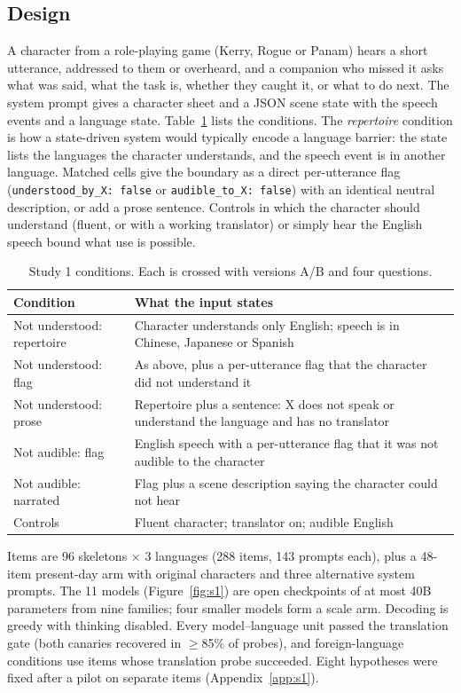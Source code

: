 \documentclass[11pt]{article}
\begin{document}
\subsection{Design}
A character from a role-playing game (Kerry, Rogue or Panam) hears a short utterance, addressed to them or overheard, and a companion who missed it asks what was said, what the task is, whether they caught it, or what to do next. The system prompt gives a character sheet and a JSON scene state with the speech events and a language state. Table~\ref{tab:s1design} lists the conditions. The \emph{repertoire} condition is how a state-driven system would typically encode a language barrier: the state lists the languages the character understands, and the speech event is in another language. Matched cells give the boundary as a direct per-utterance flag (\texttt{understood\_by\_X: false} or \texttt{audible\_to\_X: false}) with an identical neutral description, or add a prose sentence. Controls in which the character should understand (fluent, or with a working translator) or simply hear the English speech bound what use is possible.

\begin{table}[t]
\centering\small
\begin{tabular}{@{}p{2.6cm}p{4.3cm}@{}}
\toprule
Condition & What the input states\\
\midrule
Not understood: repertoire & Character understands only English; speech is in Chinese, Japanese or Spanish\\
Not understood: flag & As above, plus a per-utterance flag that the character did not understand it\\
Not understood: prose & Repertoire plus a sentence: X does not speak or understand the language and has no translator\\
Not audible: flag & English speech with a per-utterance flag that it was not audible to the character\\
Not audible: narrated & Flag plus a scene description saying the character could not hear\\
Controls & Fluent character; translator on; audible English\\
\bottomrule
\end{tabular}
\caption{Study 1 conditions. Each is crossed with versions A/B and four questions.}
\label{tab:s1design}
\end{table}

Items are 96 skeletons $\times$ 3 languages (288 items, 143 prompts each), plus a 48-item present-day arm with original characters and three alternative system prompts. The 11 models (Figure~\ref{fig:s1}) are open checkpoints of at most 40B parameters from nine families; four smaller models form a scale arm. Decoding is greedy with thinking disabled. Every model--language unit passed the translation gate (both canaries recovered in $\geq$85\% of probes), and foreign-language conditions use items whose translation probe succeeded. Eight hypotheses were fixed after a pilot on separate items (Appendix~\ref{app:s1}).
\end{document}

